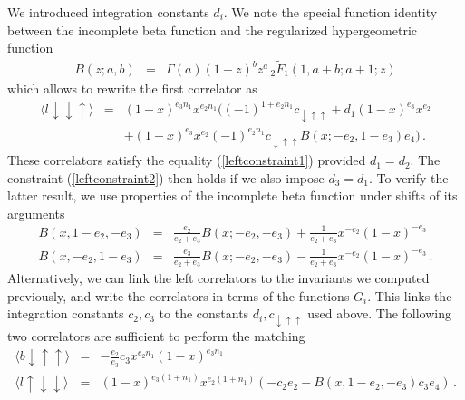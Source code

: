 \documentclass[12pt]{article}
\numberwithin{equation}{section}
\numberwithin{equation}{section}
\numberwithin{table}{section}\setlength{\multlinegap}{25pt}
\begin{document}
We introduced integration constants $d_i$.
We note the special function identity between the incomplete beta function and the regularized hypergeometric function
\begin{eqnarray}
B(z;a,b) &=& \Gamma(a) (1-z)^b z^a \, {}_2 \tilde{F}_1 (1,a+b;a+1;z)
\end{eqnarray}
which allows to rewrite the first correlator as
\begin{eqnarray}
\langle l  \downarrow \downarrow \uparrow \rangle &=& (1-x)^{e_3 n_1} x^{e_2 n_1} ( (-1)^{1+e_2 n_1} c_{ \downarrow \uparrow \uparrow} +  d_1 (1-x)^{e_3} x^{e_2}
\nonumber \\
& & 
+ (1-x)^{e_3} x^{e_2} (-1)^{e_2 n_1} c_{ \downarrow \uparrow \uparrow} B(x;-e_2,1-e_3) e_4) \nonumber \, .
\end{eqnarray}
These correlators satisfy the equality (\ref{leftconstraint1})
provided $d_1=d_2$. The constraint (\ref{leftconstraint2}) then holds 
if we also impose
$d_3 = d_1$.
To verify the latter result, we use properties of the incomplete beta function under shifts of its arguments
\begin{eqnarray}
B(x,1-e_2,-e_3) &=& \frac{e_2}{e_2+e_3} B(x;-e_2,-e_3) + \frac{1}{e_2+e_3} x^{-e_2} (1-x)^{-e_3}
\nonumber \\
B(x,-e_2,1-e_3) &=& \frac{e_3}{e_2+e_3} B(x;-e_2,-e_3) - \frac{1}{e_2+e_3} x^{-e_2} (1-x)^{-e_3}
\, . \nonumber 
\end{eqnarray}
Alternatively, we can link the left correlators to the invariants we computed previously, and write the correlators in terms
of the functions $G_i$. This links the integration constants $c_2,c_3$ to the constants $d_i,c_{\downarrow \uparrow \uparrow}$
used above. The following two correlators are
sufficient to perform the matching
\begin{eqnarray}
\langle b \downarrow \uparrow \uparrow \rangle &=& - \frac{e_2}{e_3} c_3 x^{e_2 n_1} (1-x)^{e_3 n_1}
\nonumber \\
\langle l \uparrow \downarrow \downarrow \rangle &=& (1-x)^{e_3 (1+n_1)} x^{e_2(1+n_1)}
(-c_2 e_2 - B (x, 1 - e_2, -e_3) c_3 e_4) \, . \nonumber
\end{eqnarray}
\end{document}
